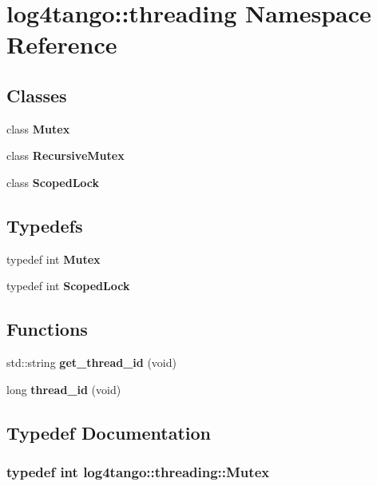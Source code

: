 \section{log4tango\-:\-:threading Namespace Reference}
\label{namespacelog4tango_1_1threading}
\subsection*{Classes}
\begin{DoxyCompactItemize}
\item 
class {\bf Mutex}
\item 
class {\bf Recursive\-Mutex}
\item 
class {\bf Scoped\-Lock}
\end{DoxyCompactItemize}
\subsection*{Typedefs}
\begin{DoxyCompactItemize}
\item 
typedef int {\bf Mutex}
\item 
typedef int {\bf Scoped\-Lock}
\end{DoxyCompactItemize}
\subsection*{Functions}
\begin{DoxyCompactItemize}
\item 
std\-::string {\bf get\-\_\-thread\-\_\-id} (void)
\item 
long {\bf thread\-\_\-id} (void)
\end{DoxyCompactItemize}


\subsection{Typedef Documentation}
\subsubsection[{Mutex}]{\setlength{\rightskip}{0pt plus 5cm}typedef int {\bf log4tango\-::threading\-::\-Mutex}}\label{namespacelog4tango_1_1threading_a6ab044c515d422f490f47a2499bf1f0a}
